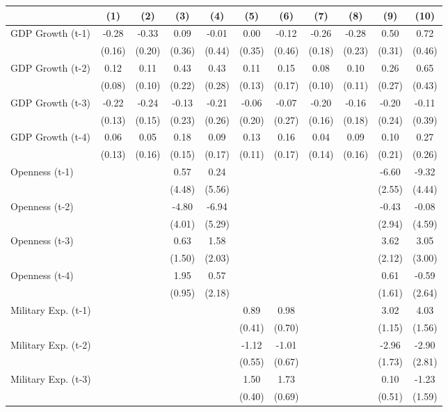 \begin{tabular}{lcccccccccc}
\toprule
& (1) & (2) & (3) & (4) & (5) & (6) & (7) & (8) & (9) & (10) \\ 
\midrule
GDP Growth (t-1) & -0.28 & -0.33 & 0.09 & -0.01 & 0.00 & -0.12 & -0.26 & -0.28 & 0.50 & 0.72 \\
& (0.16) & (0.20) & (0.36) & (0.44) & (0.35) & (0.46) & (0.18) & (0.23) & (0.31) & (0.46) \\
GDP Growth (t-2) & 0.12 & 0.11 & 0.43 & 0.43 & 0.11 & 0.15 & 0.08 & 0.10 & 0.26 & 0.65 \\
& (0.08) & (0.10) & (0.22) & (0.28) & (0.13) & (0.17) & (0.10) & (0.11) & (0.27) & (0.43) \\
GDP Growth (t-3) & -0.22 & -0.24 & -0.13 & -0.21 & -0.06 & -0.07 & -0.20 & -0.16 & -0.20 & -0.11 \\
& (0.13) & (0.15) & (0.23) & (0.26) & (0.20) & (0.27) & (0.16) & (0.18) & (0.24) & (0.39) \\
GDP Growth (t-4) & 0.06 & 0.05 & 0.18 & 0.09 & 0.13 & 0.16 & 0.04 & 0.09 & 0.10 & 0.27 \\
& (0.13) & (0.16) & (0.15) & (0.17) & (0.11) & (0.17) & (0.14) & (0.16) & (0.21) & (0.26) \\
Openness (t-1) &  &  & 0.57 & 0.24 &  &  &  &  & -6.60 & -9.32 \\
&  &  & (4.48) & (5.56) &  &  &  &  & (2.55) & (4.44) \\
Openness (t-2) &  &  & -4.80 & -6.94 &  &  &  &  & -0.43 & -0.08 \\
&  &  & (4.01) & (5.29) &  &  &  &  & (2.94) & (4.59) \\
Openness (t-3) &  &  & 0.63 & 1.58 &  &  &  &  & 3.62 & 3.05 \\
&  &  & (1.50) & (2.03) &  &  &  &  & (2.12) & (3.00) \\
Openness (t-4) &  &  & 1.95 & 0.57 &  &  &  &  & 0.61 & -0.59 \\
&  &  & (0.95) & (2.18) &  &  &  &  & (1.61) & (2.64) \\
Military Exp. (t-1) &  &  &  &  & 0.89 & 0.98 &  &  & 3.02 & 4.03 \\
&  &  &  &  & (0.41) & (0.70) &  &  & (1.15) & (1.56) \\
Military Exp. (t-2) &  &  &  &  & -1.12 & -1.01 &  &  & -2.96 & -2.90 \\
&  &  &  &  & (0.55) & (0.67) &  &  & (1.73) & (2.81) \\
Military Exp. (t-3) &  &  &  &  & 1.50 & 1.73 &  &  & 0.10 & -1.23 \\
&  &  &  &  & (0.40) & (0.69) &  &  & (0.51) & (1.59) \\

\end{tabular}
